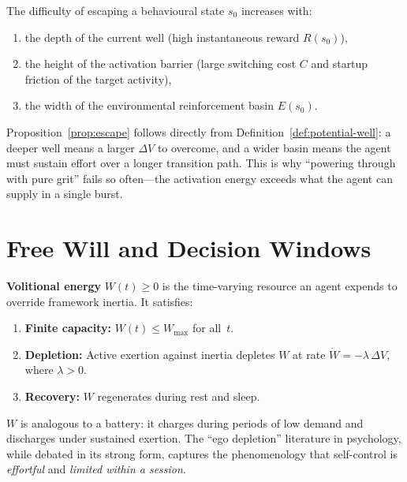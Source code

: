 \begin{proposition}\label{prop:escape}
The difficulty of escaping a behavioural state $s_0$ increases with:
\begin{enumerate}[nosep]
  \item the depth of the current well (high instantaneous reward $R(s_0)$),
  \item the height of the activation barrier (large switching cost $C$ and
        startup friction of the target activity),
  \item the width of the environmental reinforcement basin $E(s_0)$.
\end{enumerate}
\end{proposition}

\begin{discussion}
Proposition~\ref{prop:escape} follows directly from Definition~\ref{def:potential-well}:
a deeper well means a larger $\Delta V$ to overcome, and a wider basin means
the agent must sustain effort over a longer transition path. This is why
``powering through with pure grit'' fails so often---the activation energy
exceeds what the agent can supply in a single burst.
\end{discussion}

\section{Free Will and Decision Windows}\label{sec:free-will}

\begin{definition}\label{def:volition}
\textbf{Volitional energy} $W(t) \geq 0$ is the time-varying resource an
agent expends to override framework inertia. It satisfies:
\begin{enumerate}[nosep]
  \item \textbf{Finite capacity:} $W(t) \leq W_{\max}$ for all~$t$.
  \item \textbf{Depletion:} Active exertion against inertia depletes $W$ at
        rate $\dot{W} = -\lambda\,\Delta V$, where $\lambda > 0$.
  \item \textbf{Recovery:} $W$ regenerates during rest and sleep.
\end{enumerate}
\end{definition}

\begin{remark}
$W$ is analogous to a battery: it charges during periods of low demand and
discharges under sustained exertion. The ``ego depletion'' literature in
psychology, while debated in its strong form, captures the phenomenology that
self-control is \emph{effortful} and \emph{limited within a session}.
\end{remark}

